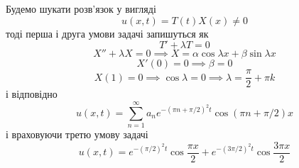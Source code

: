 \documentclass[12pt]{article} %
\begin{document}
	Будемо шукати розв’язок у вигляді
	\[u(x,t)=T(t)X(x)\neq0\]
	тоді перша і друга умови задачі запишуться як
	\[T'+\lambda T=0\]
	\[X''+\lambda X=0\implies X=\alpha\cos\lambda x+\beta\sin\lambda x\]
	\[X'(0)=0\implies\beta=0\]
	\[X(1)=0\implies\cos\lambda=0\implies\lambda=\frac{\pi}{2}+\pi k\]
	і відповідно
	\[u(x,t)=\sum_{n=1}^\infty a_ne^{-(\pi n+\pi/2)^2t}\cos(\pi n+\pi/2)x\]
	і враховуючи третю умову задачі
	\[u(x,t)=e^{-(\pi/2)^2t}\cos\frac{\pi x}{2}+e^{-(3\pi/2)^2t}\cos\frac{3\pi x}{2}\]
\end{document}
